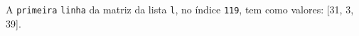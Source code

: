 \documentclass[12pt,varwidth=16cm,border=1pt]{standalone}
\begin{document}
A \verb+primeira+ \verb+linha+ da matriz da lista \verb+l+, no índice \verb+119+, tem como valores: [31, 3, 39].

\questiomfalse
\end{document}
